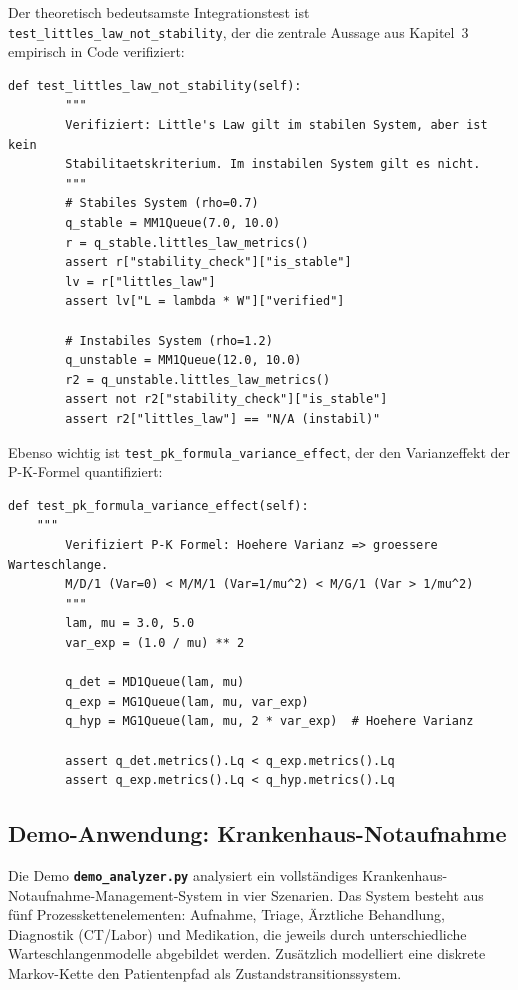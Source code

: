 ﻿\documentclass[a4paper,12pt]{scrreprt}
\theoremstyle{definition}
\begin{document}
Der theoretisch bedeutsamste Integrationstest ist
\texttt{test\_littles\_law\_not\_stability}, der die zentrale Aussage
aus Kapitel~3 empirisch in Code verifiziert:

\begin{lstlisting}[style=python, caption={Test: Little's Law ist kein Stabilitätskriterium (empirische Verifikation)}, label=lst:test-littles-not-stability]
def test_littles_law_not_stability(self):
        """
        Verifiziert: Little's Law gilt im stabilen System, aber ist kein
        Stabilitaetskriterium. Im instabilen System gilt es nicht.
        """
        # Stabiles System (rho=0.7)
        q_stable = MM1Queue(7.0, 10.0)
        r = q_stable.littles_law_metrics()
        assert r["stability_check"]["is_stable"]
        lv = r["littles_law"]
        assert lv["L = lambda * W"]["verified"]

        # Instabiles System (rho=1.2)
        q_unstable = MM1Queue(12.0, 10.0)
        r2 = q_unstable.littles_law_metrics()
        assert not r2["stability_check"]["is_stable"]
        assert r2["littles_law"] == "N/A (instabil)"
\end{lstlisting}

Ebenso wichtig ist \texttt{test\_pk\_formula\_variance\_effect}, der den
Varianzeffekt der P-K-Formel quantifiziert:

\begin{lstlisting}[style=python, caption={Test: P-K-Formel -- höhere Varianz ergibt längere Warteschlange}, label=lst:test-pk]
def test_pk_formula_variance_effect(self):
	"""
        Verifiziert P-K Formel: Hoehere Varianz => groessere Warteschlange.
        M/D/1 (Var=0) < M/M/1 (Var=1/mu^2) < M/G/1 (Var > 1/mu^2)
        """
        lam, mu = 3.0, 5.0
        var_exp = (1.0 / mu) ** 2

        q_det = MD1Queue(lam, mu)
        q_exp = MG1Queue(lam, mu, var_exp)
        q_hyp = MG1Queue(lam, mu, 2 * var_exp)  # Hoehere Varianz

        assert q_det.metrics().Lq < q_exp.metrics().Lq
        assert q_exp.metrics().Lq < q_hyp.metrics().Lq
\end{lstlisting}

\subsection{Demo-Anwendung: Krankenhaus-Notaufnahme}
\label{sec:demo-krankenhaus-system}

Die Demo \texttt{\textbf{demo\_analyzer.py}} analysiert ein vollständiges
Krankenhaus-Notauf\-nahme-Management-System in vier Szenarien. Das System
besteht aus fünf Prozesskettenelementen: Aufnahme, Triage, Ärztliche
Behandlung, Diagnostik (CT/Labor) und Medikation, die jeweils durch
unterschiedliche Warteschlangenmodelle abgebildet werden. Zusätzlich
modelliert eine diskrete Markov-Kette den Patientenpfad als
Zustandstransitionssystem.
\end{document}
